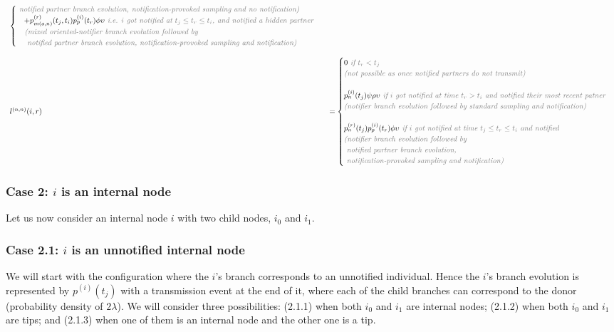 \documentclass[a4paper,10pt]{article}
\begin{document}
\begin{equation}
\begin{array}{ll}
\begin{cases}
\textit{\color{gray}~notified partner branch evolution, notification-provoked sampling and no notification)}\\
~~~+p_{m(o,n)}^{(r)}(t_j,t_i)p_p^{(i)}(t_r)\phi\upsilon \textit{\color{gray} ~i.e. $i$ got notified at $t_j \leq t_r \leq t_i$, and notified a hidden partner}\\
 \textit{\color{gray} ~~~(mixed oriented-notifier branch evolution followed by} \\
\textit{\color{gray}~~~~notified partner branch evolution, notification-provoked sampling and notification)}\\
\end{cases}\\
\\
l^{(n,n)}(i,r) &= \begin{cases}0 \textit{\color{gray} ~if $t_r < t_j$}\\
\textit{\color{gray} (not possible as once notified partners do not transmit)}\\
\\
p_n^{(i)}(t_j)\psi\rho\upsilon \textit{\color{gray} ~if $i$ got notified at time $t_r > t_i$ and notified their most recent patner}\\
\textit{\color{gray} (notifier branch evolution followed by standard sampling and  notification)}\\
\\
p_n^{(r)}(t_j) p_p^{(i)}(t_r) \phi \upsilon \textit{\color{gray} ~if $i$ got notified at time $t_j \leq t_r \leq t_i$ and notified}\\
\textit{\color{gray} (notifier branch evolution followed by} \\
\textit{\color{gray}~notified partner branch evolution,} \\
\textit{\color{gray}~notification-provoked sampling and notification)}\\
\end{cases}\\
\end{array}
\label{eq:tip}
\end{equation}

\subsubsection*{Case 2: $i$ is an internal node} 
Let us now consider an internal node $i$ with two child nodes, $i_0$ and $i_1$. 

\subsubsection*{Case 2.1: $i$ is an unnotified internal node} 
We will start with the configuration where the $i$'s branch corresponds to an unnotified individual. Hence the $i$'s branch evolution is represented by $p^{(i)}(t_j)$ with a transmission event at the end of it, where each of the child branches can correspond to the donor (probability density of $2\lambda$). We will consider three possibilities: (2.1.1) when both $i_0$ and $i_1$ are internal nodes; (2.1.2) when both $i_0$ and $i_1$ are tips; and (2.1.3) when one of them is an internal node and the other one is a tip.
\end{document}
